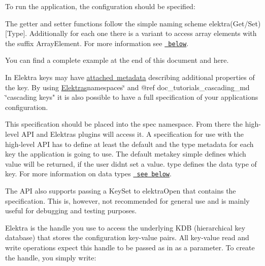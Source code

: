 To run the application, the configuration should be specified\+:


\begin{DoxyCode}{0}
\end{DoxyCode}


The getter and setter functions follow the simple naming scheme {\ttfamily elektra}({\ttfamily Get}/{\ttfamily Set})\mbox{[}Type\mbox{]}. Additionally for each one there is a variant to access array elements with the suffix {\ttfamily Array\+Element}. For more information see \href{\#reading-and-writing-values}{\texttt{ below}}.

You can find a complete example at the end of this document and here.

In Elektra keys may have \mbox{\hyperlink{doc_help_elektra-metadata_md}{attached metadata}} describing additional properties of the key. By using \mbox{\hyperlink{doc_tutorials_namespaces_md}{Elektra\textquotesingle{}s}}namespaces\char`\"{} and @ref doc\+\_\+tutorials\+\_\+cascading\+\_\+md \char`\"{}cascading keys" it is also possible to have a full specification of your applications configuration.

This specification should be placed into the {\ttfamily spec} namespace. From there the high-\/level A\+PI and Elektra\textquotesingle{}s plugins will access it. A specification for use with the high-\/level A\+PI has to define at least the {\ttfamily default} and the {\ttfamily type} metadata for each key the application is going to use. The {\ttfamily default} metakey simple defines which value will be returned, if the user didn\textquotesingle{}t set a value. {\ttfamily type} defines the data type of key. For more information on data types \href{\#data-types}{\texttt{ see below}}.

The A\+PI also supports passing a {\ttfamily Key\+Set} to {\ttfamily elektra\+Open} that contains the specification. This is, however, not recommended for general use and is mainly useful for debugging and testing purposes.

{\ttfamily Elektra} is the handle you use to access the underlying K\+DB (hierarchical key database) that stores the configuration key-\/value pairs. All key-\/value read and write operations expect this handle to be passed as in as a parameter. To create the handle, you simply write\+:


\begin{DoxyCode}{0}
\end{DoxyCode}


